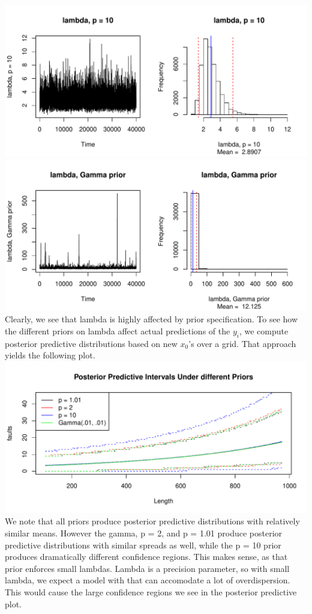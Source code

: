 \documentclass[12pt]{article}
\begin{document}
\begin{enumerate}[(a)]
\begin{enumerate}[(i)]
	 \includegraphics[scale = .7]{plot13.pdf}\\
	 \includegraphics[scale = .7]{plot14.pdf}\\
	 \newline
	 Clearly, we see that lambda is highly affected by prior specification. To see how the different priors on lambda affect actual predictions of the $y_i$, we compute posterior predictive distributions based on new $x_0$'s over a grid. That approach yields the following plot. \\
	 \newline
	 \includegraphics[scale = .7]{plot15.pdf}\\
	 \newline
	 We note that all priors produce posterior predictive distributions with relatively similar means. However the gamma, p = 2, and p = 1.01 produce posterior predictive distributions with similar spreads as well, while the p = 10 prior produces dramatically different confidence regions. This makes sense, as that prior enforces small lambdas. Lambda is a precision parameter, so with small lambda, we expect a model with that can accomodate a lot of overdispersion. This would cause the large confidence regions we see in the posterior predictive plot. 
	 

\end{enumerate}
\end{enumerate}
\end{document}
